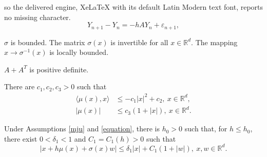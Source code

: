 \documentclass[10pt,a4paper]{amsart}
\begin{document}
so the delivered engine, XeLaTeX with its default Latin Modern text font, reports no missing character.
\begin{equation}\label{recursion0}
Y_{n+1}-Y_n=-hAY_{n}+\varepsilon_{n+1},
\end{equation}

\begin{assumption}\label{mju}
$\sigma$ is bounded. The matrix $\sigma(x)$ is invertible
for all $x\in\mathbb{R}^d$. The mapping $x\to\sigma^{-1}(x)$ is locally bounded.
\end{assumption}

\begin{assumption}\label{aat}
$A+A^T$ is positive definite.
\end{assumption}

\begin{assumption}\label{equation}   
There are $c_{1},c_{2},c_3>0$ such that
\begin{align}
  \langle \mu(x),x\rangle&\leq -c_{1} |x|^{2}+c_{2},\ x\in\mathbb{R}^{d},\label{kell}\\
  |\mu(x)|&\leq c_3(1+|x|),\ x\in\mathbb{R}^d.\label{valaki}
\end{align}
\end{assumption}

\begin{lemma}\label{varv} Under Assumptions \ref{mju} and \ref{equation}, there is $h_0>0$ such that,
for $h\leq h_0$,
there exist $0<\delta_1<1$ and $C_1=C_1(h)>0$ such that
\begin{equation}\label{dollars}
|x+h\mu(x)+\sigma(x)w|\leq \delta_1 |x|+C_1(1+|w|),\ x,w\in\mathbb{R}^d.
\end{equation}
\end{lemma}
\end{document}
